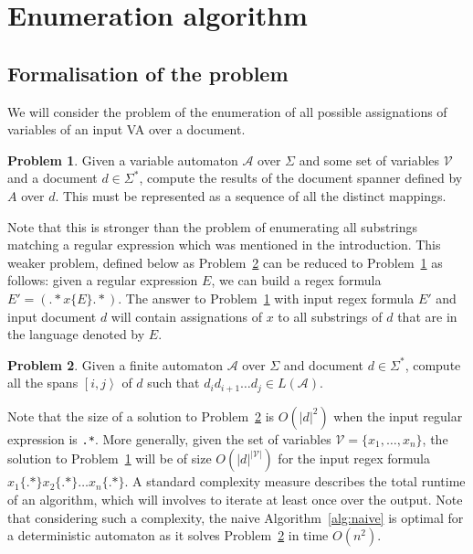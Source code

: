 \documentclass[12px]{article}
\theoremstyle{definition}
\newtheorem{problem}{Problem}
\newcommand{\Span}[1]{\left[ #1 \right\rangle}
\begin{document}
  \section{Enumeration algorithm}

    \subsection{Formalisation of the problem}

      We will consider the problem of the enumeration of all possible
      assignations of variables of an input VA over a document.

      \begin{problem}%
        \label{pb:strong}
        Given a variable automaton $\mathcal{A}$ over $\Sigma$ and some set of
        variables $\mathcal{V}$ and a document $d \in \Sigma^*$, compute the
        results of the document spanner defined by $A$ over $d$. This must be
        represented as a sequence of all the distinct mappings.
      \end{problem}

      Note that this is stronger than the problem of enumerating all substrings
      matching a regular expression which was mentioned in the introduction.
      This weaker problem, defined below as Problem~\ref{pb:weak} can be
      reduced to Problem~\ref{pb:strong} as follows: given a regular expression
      $E$, we can build a regex formula $E' = ({.}* x\{E\} {.}*)$. The answer
      to Problem~\ref{pb:strong} with input regex formula $E'$ and input
      document $d$ will contain assignations of $x$ to all substrings of $d$
      that are in the language denoted by $E$.

      \begin{problem}%
        \label{pb:weak}
        Given a finite automaton $\mathcal{A}$ over $\Sigma$ and document $d
        \in \Sigma^*$, compute all the spans $\Span{i, j}$ of $d$ such that
        $d_i d_{i+1} \ldots d_j \in L(\mathcal{A})$.
      \end{problem}

      Note that the size of a solution to Problem~\ref{pb:weak} is $O(|d|^2)$
      when the input regular expression is \texttt{.*}. More generally, given
      the set of variables $\mathcal{V} = \{x_1, \ldots, x_n\}$, the solution
      to Problem~\ref{pb:strong} will be of size $O(|d|^{|\mathcal{V}|})$ for
      the input regex formula \texttt{$x_1\{.*\} x_2\{.*\} \ldots x_n\{.*\}$}.
      A standard complexity measure describes the total runtime of an
      algorithm, which will involves to iterate at least once over the output.
      Note that considering such a complexity, the naive
      Algorithm~\ref{alg:naive} is optimal for a deterministic automaton as it
      solves Problem~\ref{pb:weak} in time $O(n^2)$.
\end{document}
